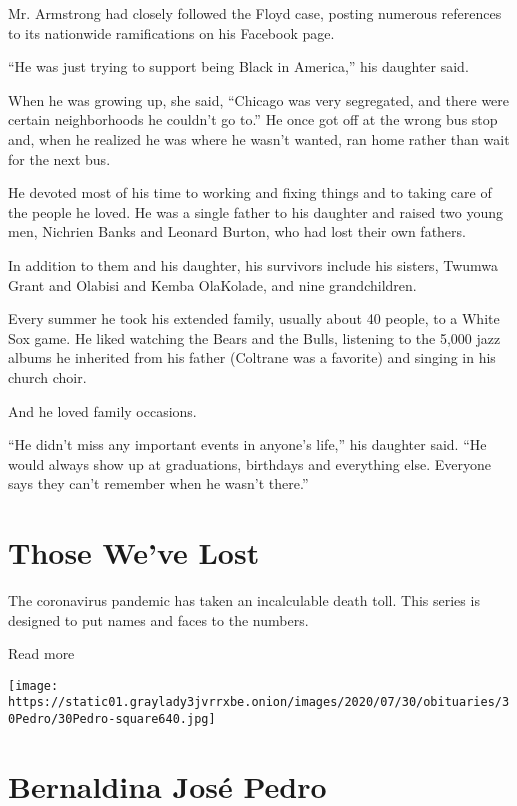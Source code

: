 Mr. Armstrong had closely followed the Floyd case, posting numerous
references to its nationwide ramifications on his Facebook page.

``He was just trying to support being Black in America,'' his daughter
said.

When he was growing up, she said, ``Chicago was very segregated, and
there were certain neighborhoods he couldn't go to.'' He once got off at
the wrong bus stop and, when he realized he was where he wasn't wanted,
ran home rather than wait for the next bus.

He devoted most of his time to working and fixing things and to taking
care of the people he loved. He was a single father to his daughter and
raised two young men, Nichrien Banks and Leonard Burton, who had lost
their own fathers.

In addition to them and his daughter, his survivors include his sisters,
Twumwa Grant and Olabisi and Kemba OlaKolade, and nine grandchildren.

Every summer he took his extended family, usually about 40 people, to a
White Sox game. He liked watching the Bears and the Bulls, listening to
the 5,000 jazz albums he inherited from his father (Coltrane was a
favorite) and singing in his church choir.

And he loved family occasions.

``He didn't miss any important events in anyone's life,'' his daughter
said. ``He would always show up at graduations, birthdays and everything
else. Everyone says they can't remember when he wasn't there.''

\href{https://www.nytimes3xbfgragh.onion/interactive/2020/obituaries/people-died-coronavirus-obituaries.html?action=click\&pgtype=Article\&state=default\&region=BELOW_MAIN_CONTENT\&context=covid_obits_promo}{}

\hypertarget{those-weve-lost}{%
\section{Those We've Lost}\label{those-weve-lost}}

The coronavirus pandemic has taken an incalculable death toll. This
series is designed to put names and faces to the numbers.

Read more

\texttt{[image: https://static01.graylady3jvrrxbe.onion/images/2020/07/30/obituaries/30Pedro/30Pedro-square640.jpg]}

\hypertarget{bernaldina-josuxe9-pedro}{%
\section{Bernaldina José Pedro}\label{bernaldina-josuxe9-pedro}}

